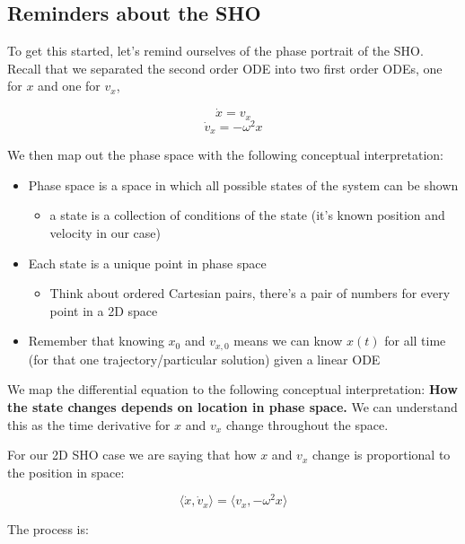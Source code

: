 \subsection{Reminders about the SHO}\label{reminders-about-the-sho}

To get this started, let's remind ourselves of the phase portrait of the
SHO. Recall that we separated the second order ODE into two first order
ODEs, one for \(x\) and one for \(v_x\),

\[\dot{x} = v_x\] \[\dot{v}_x=-\omega^2x\]

We then map out the phase space with the following conceptual
interpretation:

\begin{itemize}
\tightlist
\item
  Phase space is a space in which all possible states of the system can
  be shown

  \begin{itemize}
  \tightlist
  \item
    a state is a collection of conditions of the state (it's known
    position and velocity in our case)
  \end{itemize}
\item
  Each state is a unique point in phase space

  \begin{itemize}
  \tightlist
  \item
    Think about ordered Cartesian pairs, there's a pair of numbers for
    every point in a 2D space
  \end{itemize}
\item
  Remember that knowing \(x_0\) and \(v_{x,0}\) means we can know
  \(x(t)\) for all time (for that one trajectory/particular solution)
  given a linear ODE
\end{itemize}

We map the differential equation to the following conceptual
interpretation: \textbf{How the state changes depends on location in
phase space.} We can understand this as the time derivative for \(x\)
and \(v_x\) change throughout the space.

For our 2D SHO case we are saying that how \(x\) and \(v_x\) change is
proportional to the position in space:

\[\langle \dot{x}, \dot{v}_x \rangle = \langle v_x, -\omega^2 x\rangle\]

The process is:


